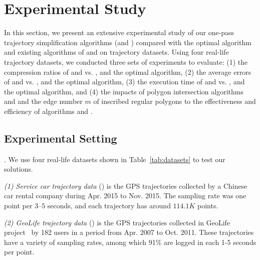 \section{Experimental Study} %
\label{sec-exp}


In this section, we present an extensive experimental study of our one-pass trajectory simplification algorithms (\cist and \cista) compared with the optimal algorithm and existing algorithms of \dps and \squishe on trajectory datasets.
Using four real-life trajectory datasets, we conducted three sets of experiments to evaluate:
(1) the compression ratios of \cist and \cista vs. \dps, \squishe and the optimal algorithm,
(2) the average errors of \cist and \cista vs. \dps, \squishe and the optimal algorithm,
(3) the execution time of \cist and \cista vs. \dps, \squishe and the optimal algorithm, and
(4) the impacts of polygon intersection algorithms \rpia and \cpia and the edge number $m$ of inscribed regular polygons to the effectiveness and efficiency of algorithms \cist and \cista.


\subsection{Experimental Setting}

.
We use four real-life datasets shown in Table~\ref{tab:datasets} to test our solutions.


\vspace{0.5ex}
\ni \emph{(1) Service car trajectory data} (\sercar) is the GPS trajectories collected by a Chinese car rental company during Apr. 2015 to Nov. 2015. The sampling rate was one point per $3$--$5$ seconds, and
each trajectory has around $114.1K$ points.

\vspace{0.5ex}
\ni \emph{(2) GeoLife trajectory data} (\geolife) is the GPS trajectories collected in GeoLife project~\cite{Zheng:GeoLife} by 182 users in a period from Apr. 2007 to Oct. 2011. These trajectories have a variety of sampling rates, among which 91\% are logged in each 1-5 seconds per point. %

